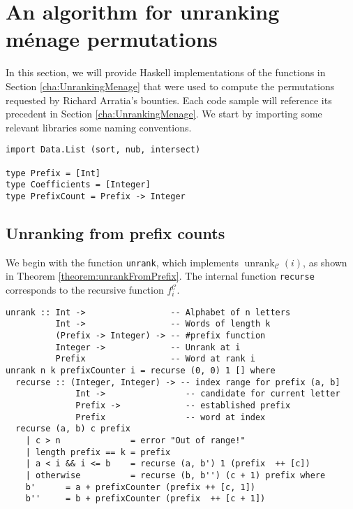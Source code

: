 \section{An algorithm for unranking m\'enage permutations}
\label{apndx:haskell}
In this section, we will provide Haskell implementations of the functions in
Section \ref{cha:UnrankingMenage} that were used to compute the permutations
requested by Richard Arratia's bounties.
Each code sample will reference its
precedent in Section \ref{cha:UnrankingMenage}. We start by importing some
relevant libraries
some naming conventions.

\begin{singlespace}\begin{verbatim}
import Data.List (sort, nub, intersect)

type Prefix = [Int]
type Coefficients = [Integer]
type PrefixCount = Prefix -> Integer
\end{verbatim}\end{singlespace}

\subsection{Unranking from prefix counts}

We begin with the function \texttt{unrank}, which implements
$\operatorname{unrank}_\mathcal{C}(i)$, as shown in
Theorem \ref{theorem:unrankFromPrefix}. The internal function
\texttt{recurse} corresponds to the recursive function $f_i^\mathcal{C}$.
\begin{singlespace}\begin{verbatim}
unrank :: Int ->                 -- Alphabet of n letters
          Int ->                 -- Words of length k
          (Prefix -> Integer) -> -- #prefix function
          Integer ->             -- Unrank at i
          Prefix                 -- Word at rank i
unrank n k prefixCounter i = recurse (0, 0) 1 [] where
  recurse :: (Integer, Integer) -> -- index range for prefix (a, b]
              Int ->                -- candidate for current letter
              Prefix ->             -- established prefix
              Prefix                -- word at index
  recurse (a, b) c prefix
    | c > n              = error "Out of range!"
    | length prefix == k = prefix
    | a < i && i <= b    = recurse (a, b') 1 (prefix  ++ [c])
    | otherwise          = recurse (b, b'') (c + 1) prefix where
    b'      = a + prefixCounter (prefix ++ [c, 1])
    b''     = b + prefixCounter (prefix  ++ [c + 1])
\end{verbatim}\end{singlespace}

